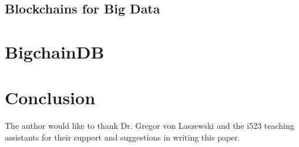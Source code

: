 \documentclass[sigconf]{acmart}
\begin{document}
\subsection{Blockchains for Big Data}

\section{BigchainDB}

\section{Conclusion}

\begin{acks}
The author would like to thank Dr. Gregor von Laszewski and the i523 teaching assistants for their support and suggestions in writing this paper.
\end{acks}


 
\end{document}
